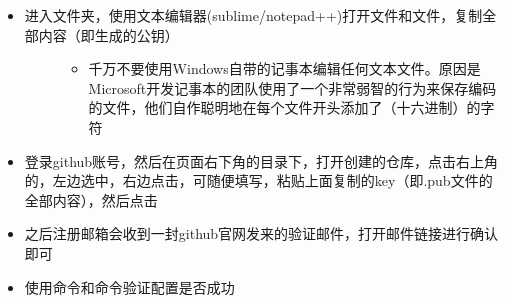\documentclass[a4paper,10pt,english]{sphinxmanual}
\begin{document}
\begin{figure}[htbp]
\centering

\noindent{}
\end{figure}
\begin{itemize}
\item {} \begin{description}
\item[{进入文件夹，使用文本编辑器(sublime/notepad++)打开文件和文件，复制全部内容（即生成的公钥）}] \leavevmode\begin{itemize}
\item {} 
千万不要使用Windows自带的记事本编辑任何文本文件。原因是Microsoft开发记事本的团队使用了一个非常弱智的行为来保存编码的文件，他们自作聪明地在每个文件开头添加了（十六进制）的字符

\end{itemize}

\end{description}

\end{itemize}

\begin{figure}[htbp]
\centering

\noindent{}
\end{figure}

\begin{figure}[htbp]
\centering

\noindent{}
\end{figure}
\begin{itemize}
\item {} 
登录github账号，然后在页面右下角的目录下，打开创建的仓库，点击右上角的，左边选中，右边点击，可随便填写，粘贴上面复制的key（即.pub文件的全部内容），然后点击

\end{itemize}

\begin{figure}[htbp]
\centering

\noindent{}
\end{figure}

\begin{figure}[htbp]
\centering

\noindent{}
\end{figure}
\begin{itemize}
\item {} 
之后注册邮箱会收到一封github官网发来的验证邮件，打开邮件链接进行确认即可

\item {} 
使用命令和命令验证配置是否成功

\end{itemize}
\end{document}

